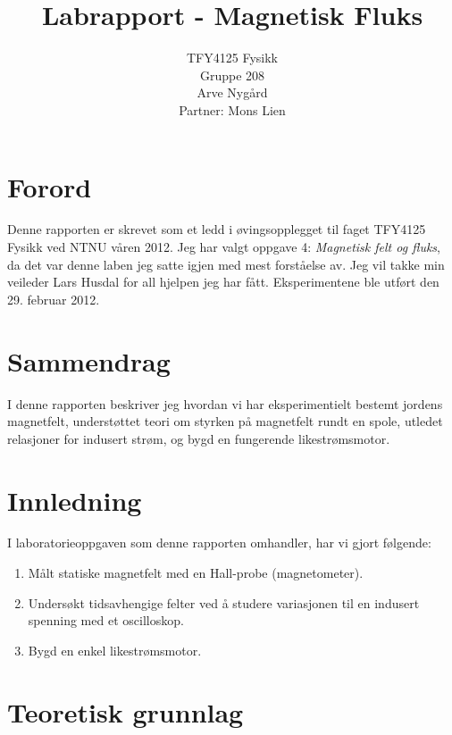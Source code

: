 \documentclass[12pt,norsk,a4paper]{article}
\begin{document}
\title{Labrapport - Magnetisk Fluks}
\author {TFY4125 Fysikk \\ Gruppe 208 \\ Arve Nygård \\ Partner: Mons Lien}

\maketitle

\clearpage



\section*{Forord}
Denne rapporten er skrevet som et ledd i øvingsopplegget til faget TFY4125 Fysikk ved NTNU våren 2012. Jeg har valgt oppgave 4: \textit{Magnetisk felt og fluks}, da det var denne laben jeg satte igjen med mest forståelse av. Jeg vil takke min veileder Lars Husdal for all hjelpen jeg har fått. Eksperimentene ble utført den 29. februar 2012.
\clearpage
\setcounter{page}{1}


\section*{Sammendrag}
I denne rapporten beskriver jeg hvordan vi har eksperimentielt bestemt jordens magnetfelt, understøttet teori om styrken på magnetfelt rundt en spole, utledet relasjoner for indusert strøm, og bygd en fungerende likestrømsmotor.
\clearpage




\tableofcontents
\clearpage


\section{Innledning}

I laboratorieoppgaven som denne rapporten omhandler, har vi gjort følgende:
\begin{enumerate}
\item Målt statiske magnetfelt med en Hall-probe (magnetometer). 
\item Undersøkt tidsavhengige felter ved å studere variasjonen til en indusert spenning med et oscilloskop. 
\item Bygd en enkel likestrømsmotor.
\end{enumerate}
\clearpage




\section{Teoretisk grunnlag}
\end{document}

